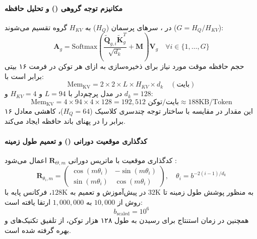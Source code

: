 \paragraph*{مکانیزم توجه گروهی () و تحلیل حافظه}
در  \cite{ainslie2023gqa}، سرهای پرسمان ($H_Q$) به $H_{KV}$ گروه تقسیم می‌شوند ($G = H_Q / H_{KV}$):
\begin{equation}
    \mathbf{A}_g = \text{Softmax}\left( \frac{\tilde{\mathbf{Q}}_{g, i} \tilde{\mathbf{K}}_g^T}{\sqrt{d_k}} + \mathbf{M} \right) \mathbf{V}_g \quad \forall i \in \{1, \dots, G\}
\end{equation}
حجم حافظه موقت مورد نیاز برای ذخیره‌سازی  به ازای هر توکن در فرمت ۱۶ بیتی برابر است با:
\begin{equation}
    \text{Mem}_{\text{KV}} = 2 \times 2 \times L \times H_{KV} \times d_k \quad (\text{بایت})
\end{equation}
در مدل پرچم‌دار  با $L=94$ و $H_{KV}=4$ و $d_k=128$:
\begin{equation}
    \text{Mem}_{\text{KV}} = 4 \times 94 \times 4 \times 128 = 192,512 \text{ بایت/توکن} \approx 188\text{KB/Token}
\end{equation}
این مقدار در مقایسه با ساختار توجه چندسری کلاسیک ($H_Q = 64$)، کاهشی معادل ۱۶ برابر را در پهنای باند حافظه ایجاد می‌کند.

\paragraph*{کدگذاری موقعیت دورانی () و تعمیم طول زمینه}
کدگذاری موقعیت با ماتریس دورانی $\mathbf{R}_{\Theta, m}$ اعمال می‌شود \cite{su2024roformer}:
\begin{equation}
    \mathbf{R}_{\theta_i, m} = \begin{pmatrix} \cos(m \theta_i) & -\sin(m \theta_i) \\ \sin(m \theta_i) & \cos(m \theta_i) \end{pmatrix}, \quad \theta_i = b^{-2(i-1)/d_k}
\end{equation}
به منظور پوشش طول زمینه تا $32\text{K}$ در پیش‌آموزش و تعمیم به $128\text{K}$، فرکانس پایه با روش  \cite{xiong2023effective} از $10,000$ به $1,000,000$ ارتقا یافته است:
\begin{equation}
    b_{\text{scaled}} = 10^6
\end{equation}
همچنین در زمان استنتاج برای رسیدن به طول ۱۲۸ هزار توکن، از تلفیق تکنیک‌های  \cite{peng2023yarn} و  \cite{an2024trainingfree} بهره گرفته شده است.

